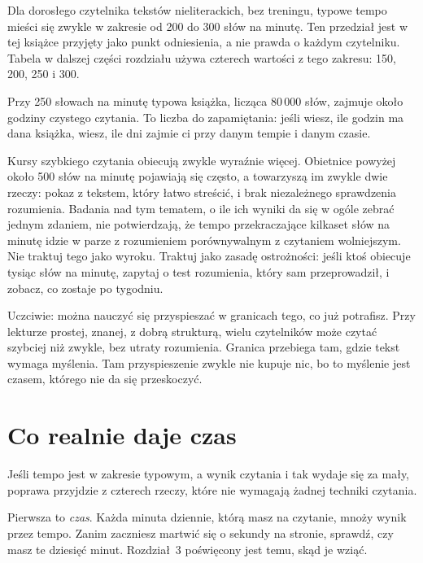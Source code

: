 Dla dorosłego czytelnika tekstów nieliterackich, bez treningu, typowe tempo mieści się zwykle w zakresie od 200 do 300 słów na minutę. Ten przedział jest w tej książce przyjęty jako punkt odniesienia, a nie prawda o każdym czytelniku. Tabela w dalszej części rozdziału używa czterech wartości z tego zakresu: 150, 200, 250 i 300.

Przy 250 słowach na minutę typowa książka, licząca 80\,000 słów, zajmuje około  godziny czystego czytania. To liczba do zapamiętania: jeśli wiesz, ile godzin ma dana książka, wiesz, ile dni zajmie ci przy danym tempie i danym czasie.

Kursy szybkiego czytania obiecują zwykle wyraźnie więcej. Obietnice powyżej około 500 słów na minutę pojawiają się często, a towarzyszą im zwykle dwie rzeczy: pokaz z tekstem, który łatwo streścić, i brak niezależnego sprawdzenia rozumienia. Badania nad tym tematem, o ile ich wyniki da się w ogóle zebrać jednym zdaniem, nie potwierdzają, że tempo przekraczające kilkaset słów na minutę idzie w parze z rozumieniem porównywalnym z czytaniem wolniejszym. Nie traktuj tego jako wyroku. Traktuj jako zasadę ostrożności: jeśli ktoś obiecuje tysiąc słów na minutę, zapytaj o test rozumienia, który sam przeprowadził, i zobacz, co zostaje po tygodniu.

Uczciwie: można nauczyć się przyspieszać w granicach tego, co już potrafisz. Przy lekturze prostej, znanej, z dobrą strukturą, wielu czytelników może czytać szybciej niż zwykle, bez utraty rozumienia. Granica przebiega tam, gdzie tekst wymaga myślenia. Tam przyspieszenie zwykle nie kupuje nic, bo to myślenie jest czasem, którego nie da się przeskoczyć.

\section{Co realnie daje czas}

Jeśli tempo jest w zakresie typowym, a wynik czytania i tak wydaje się za mały, poprawa przyjdzie z czterech rzeczy, które nie wymagają żadnej techniki czytania.

Pierwsza to \emph{czas}. Każda minuta dziennie, którą masz na czytanie, mnoży wynik przez tempo. Zanim zaczniesz martwić się o sekundy na stronie, sprawdź, czy masz te dziesięć minut. Rozdział~3 poświęcony jest temu, skąd je wziąć.

